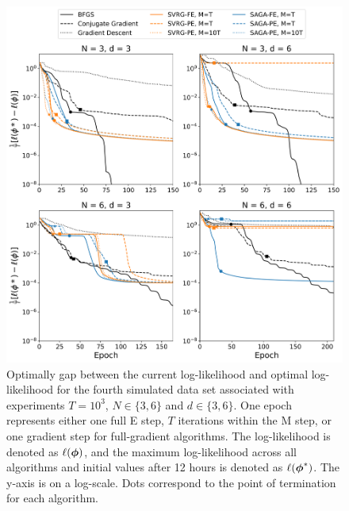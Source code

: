 \documentclass[12pt]{article}
\begin{document}
\begin{figure}[H]
    \centering
    \includegraphics[width=6.5in]{../plt/log-like_v_epoch_T-1000-003.png}
    \caption{Optimally gap between the current log-likelihood and optimal log-likelihood for the fourth simulated data set associated with experiments $T=10^{3}$, $N \in \{3,6\}$ and $d \in \{3,6\}$. One epoch represents either one full E step, $T$ iterations within the M step, or one gradient step for full-gradient algorithms. The log-likelihood is denoted as $\ell(\boldsymbol{\phi})$, and the maximum log-likelihood across all algorithms and initial values after 12 hours is denoted as $\ell(\boldsymbol{\phi}^*)$. The y-axis is on a log-scale. Dots correspond to the point of termination for each algorithm.}
\end{figure}
%
\end{document}
